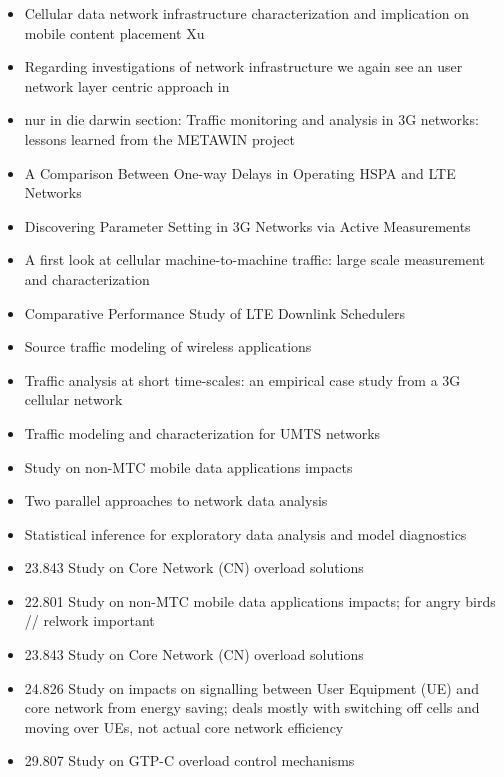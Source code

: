 
\begin{itemize}
	\item Cellular data network infrastructure characterization and implication on mobile content placement Xu\cite{Xu:2011:CDN:2007116.2007149}
	\item Regarding investigations of network infrastructure we again see an user network layer centric approach in \cite{Xu:2011:CDN:2007116.2007149}
	\item nur in die darwin section: Traffic monitoring and analysis in 3G networks: lessons learned from the METAWIN project \cite{ricciato2006traffic}
	\item A Comparison Between One-way Delays in Operating HSPA and LTE Networks \cite{laner2012delaycomparison}
	\item Discovering Parameter Setting in 3G Networks via Active Measurements \cite{4640935}
	\item A first look at cellular machine-to-machine traffic: large scale measurement and characterization \cite{Shafiq:2012:FLC:2254756.2254767}
	\item Comparative Performance Study of LTE Downlink Schedulers \cite{biernacki2013ltescheduler}
	\item Source traffic modeling of wireless applications \cite{staehle2000source}
	\item Traffic analysis at short time-scales: an empirical case study from a 3G cellular network \cite{4570772}
	\item Traffic modeling and characterization for UMTS networks \cite{965876}
	\item Study on non-MTC mobile data applications impacts \cite{3gpp.22.801}
	\item Two parallel approaches to network data analysis \cite{baer2011two}
	\item Statistical inference for exploratory data analysis and model diagnostics \cite{Buja13112009}
	\item 23.843 \cite{3gpp.23.843} Study on Core Network (CN) overload solutions
\end{itemize}

\begin{itemize}
	\item 22.801 \cite{3gpp.22.801} Study on non-MTC mobile data applications impacts; for angry birds // relwork important
	\item 23.843 \cite{3gpp.23.843} Study on Core Network (CN) overload solutions
	\item 24.826 \cite{3gpp.24.826} Study on impacts on signalling between User Equipment (UE) and core network from energy saving; deals mostly with switching off cells and moving over UEs, not actual core network efficiency
	\item 29.807 \cite{3gpp.29.807} Study on GTP-C overload control mechanisms
\end{itemize}


